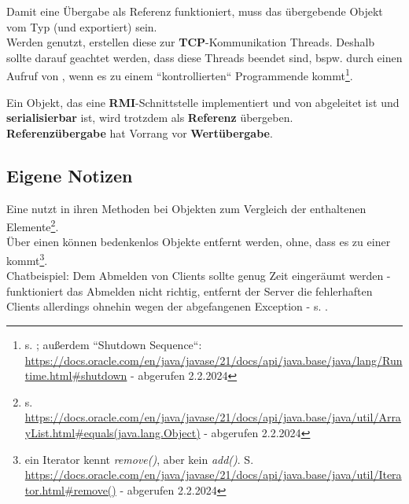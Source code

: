 \noindent
Damit eine Übergabe als Referenz funktioniert, muss das übergebende Objekt vom Typ  (und exportiert) sein.\\

\noindent
Werden  genutzt, erstellen diese zur \textbf{TCP}-Kommunikation Threads.
Deshalb sollte darauf geachtet werden, dass diese Threads beendet sind, bspw. durch einen Aufruf von , wenn es zu einem ``kontrollierten`` Programmende kommt\footnote{s. \cite[352]{Oec22}; außerdem ``Shutdown Sequence``: \url{https://docs.oracle.com/en/java/javase/21/docs/api/java.base/java/lang/Runtime.html#shutdown} - abgerufen 2.2.2024
}.

\begin{tcolorbox}[enlarge top by=0.5cm,enlarge bottom by=0.5cm]
    \item Ein Objekt, das eine \textbf{RMI}-Schnittstelle implementiert und von  abgeleitet ist und \textbf{serialisierbar} ist, wird trotzdem als \textbf{Referenz} übergeben.\\

    \noindent
    \textbf{Referenzübergabe} hat Vorrang vor \textbf{Wertübergabe}.
\end{tcolorbox}

\subsection*{Eigene Notizen}

\noindent
Eine  nutzt in ihren Methoden bei Objekten  zum Vergleich der enthaltenen Elemente\footnote{
    s. \url{https://docs.oracle.com/en/java/javase/21/docs/api/java.base/java/util/ArrayList.html#equals(java.lang.Object)} - abgerufen 2.2.2024
}.\\

\noindent
Über einen  können bedenkenlos Objekte entfernt werden, ohne, dass es zu einer  kommt\footnote{ein Iterator kennt \textit{remove()}, aber kein \textit{add()}. S. \url{https://docs.oracle.com/en/java/javase/21/docs/api/java.base/java/util/Iterator.html#remove()} - abgerufen 2.2.2024}.\\


\noindent
Chatbeispiel: Dem Abmelden von Clients sollte genug Zeit eingeräumt werden - funktioniert das Abmelden nicht richtig, entfernt der Server die fehlerhaften Clients allerdings ohnehin wegen der abgefangenen Exception - s. \cite[345, Listing 6.22]{Oec22}.


